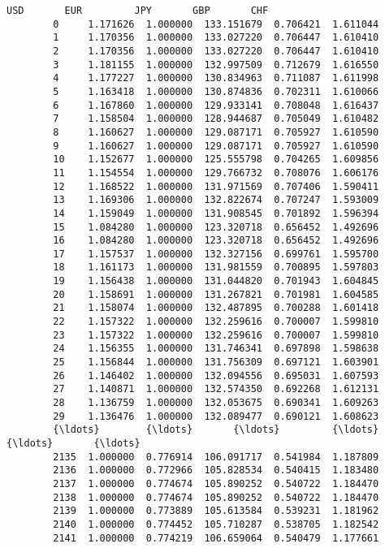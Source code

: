 \documentclass[11pt]{article}
\begin{document}
\begin{Verbatim}[commandchars=\\\{\}]
                   USD       EUR         JPY       GBP       CHF  
        0     1.171626  1.000000  133.151679  0.706421  1.611044  
        1     1.170356  1.000000  133.027220  0.706447  1.610410  
        2     1.170356  1.000000  133.027220  0.706447  1.610410  
        3     1.181155  1.000000  132.997509  0.712679  1.616550  
        4     1.177227  1.000000  130.834963  0.711087  1.611998  
        5     1.163418  1.000000  130.874836  0.702311  1.610066  
        6     1.167860  1.000000  129.933141  0.708048  1.616437  
        7     1.158504  1.000000  128.944687  0.705049  1.610482  
        8     1.160627  1.000000  129.087171  0.705927  1.610590  
        9     1.160627  1.000000  129.087171  0.705927  1.610590  
        10    1.152677  1.000000  125.555798  0.704265  1.609856  
        11    1.154554  1.000000  129.766732  0.708076  1.606176  
        12    1.168522  1.000000  131.971569  0.707406  1.590411  
        13    1.169306  1.000000  132.822674  0.707247  1.593009  
        14    1.159049  1.000000  131.908545  0.701892  1.596394  
        15    1.084280  1.000000  123.320718  0.656452  1.492696  
        16    1.084280  1.000000  123.320718  0.656452  1.492696  
        17    1.157537  1.000000  132.327156  0.699761  1.595700  
        18    1.161173  1.000000  131.981559  0.700895  1.597803  
        19    1.156438  1.000000  131.044820  0.701943  1.604845  
        20    1.158691  1.000000  131.267821  0.701981  1.604585  
        21    1.158074  1.000000  132.487895  0.700288  1.601418  
        22    1.157322  1.000000  132.259616  0.700007  1.599810  
        23    1.157322  1.000000  132.259616  0.700007  1.599810  
        24    1.156355  1.000000  131.746341  0.697898  1.598638  
        25    1.156844  1.000000  131.756309  0.697121  1.603901  
        26    1.146402  1.000000  132.094556  0.695031  1.607593  
        27    1.140871  1.000000  132.574350  0.692268  1.612131  
        28    1.136759  1.000000  132.053675  0.690341  1.609263  
        29    1.136476  1.000000  132.089477  0.690121  1.608623  
        {\ldots}        {\ldots}       {\ldots}         {\ldots}       {\ldots}       {\ldots}  
        2135  1.000000  0.776914  106.091717  0.541984  1.187809  
        2136  1.000000  0.772966  105.828534  0.540415  1.183480  
        2137  1.000000  0.774674  105.890252  0.540722  1.184470  
        2138  1.000000  0.774674  105.890252  0.540722  1.184470  
        2139  1.000000  0.773889  105.613584  0.539231  1.181962  
        2140  1.000000  0.774452  105.710287  0.538705  1.182542  
        2141  1.000000  0.774219  106.659064  0.540479  1.177661  

\end{Verbatim}
\end{document}

